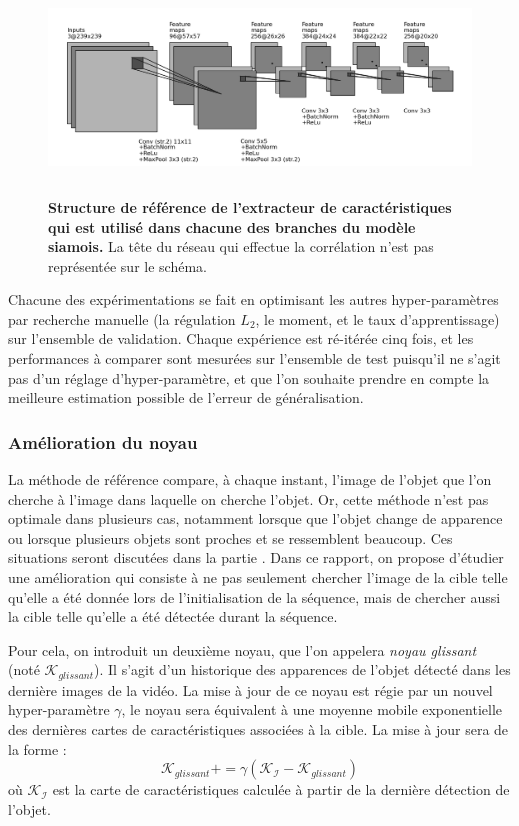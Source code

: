 \documentclass[10pt,twocolumn,letterpaper,french]{article}
\begin{document}
\begin{figure}[!h]
  \centering
  \includegraphics[height=160pt]{images/archis/convnet_cnn5.png}
  \caption{\textbf{Structure de référence de l'extracteur de caractéristiques qui est utilisé dans chacune des branches du modèle siamois.} La tête du réseau qui effectue la corrélation n'est pas représentée sur le schéma.}
  \label{archi_ref}
  \end{figure}


Chacune des expérimentations se fait en optimisant les autres hyper-paramètres par recherche manuelle (la régulation $L_2$, le moment, et le taux d'apprentissage) sur l'ensemble de validation. Chaque expérience est ré-itérée cinq fois, et les performances à comparer sont mesurées sur l'ensemble de test puisqu'il ne s'agit pas d'un réglage d'hyper-paramètre, et que l'on souhaite prendre en compte la meilleure estimation possible de l'erreur de généralisation.


\subsubsection*{Amélioration du noyau}
\label{noyau}

La méthode de référence compare, à chaque instant, l'image de l'objet que l'on cherche à l'image dans laquelle on cherche l'objet. Or, cette méthode n'est pas optimale dans plusieurs cas, notamment lorsque que l'objet change de apparence ou lorsque plusieurs objets sont proches et se ressemblent beaucoup. Ces situations seront discutées dans la partie \textit{}. Dans ce rapport, on propose d'étudier une amélioration qui consiste à ne pas seulement chercher l'image de la cible telle qu'elle a été donnée lors de l'initialisation de la séquence, mais de chercher aussi la cible telle qu'elle a été détectée durant la séquence.

Pour cela, on introduit un deuxième noyau, que l'on appelera \textit{noyau glissant} (noté $\mathcal{K}_{glissant}$). Il s'agit d'un historique des apparences de l'objet détecté dans les dernière images de la vidéo. La mise à jour de ce noyau est régie par un nouvel hyper-paramètre $\gamma$, le noyau sera équivalent à une moyenne mobile exponentielle des dernières cartes de caractéristiques associées à la cible. La mise à jour sera de la forme : 
$$\mathcal{K}_{glissant} += \gamma(\mathcal{K}_{\mathcal{I}}-\mathcal{K}_{glissant})$$
où $\mathcal{K}_{\mathcal{I}}$ est la carte de caractéristiques calculée à partir de la dernière détection de l'objet.\\
\end{document}
